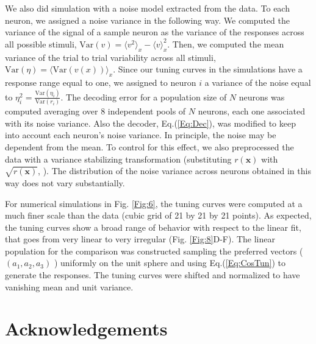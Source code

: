 \documentclass[a4paper]{article}%
\begin{document}
We also did simulation with a noise model extracted from the data. To each
neuron, we assigned a noise variance in the following way. We computed
the variance of the signal of a sample neuron as the variance of the responses across all possible
stimuli, $\text{Var}(v) = \langle v^{2} \rangle_{x} - \langle v\rangle^{2}
_{x}$. Then, we computed the mean variance of the trial to trial variability
across all stimuli, $\text{Var}(\eta) = \langle\text{Var}(v(x))\rangle_{x}$.
Since our tuning curves in the simulations have a response range equal to one, we
assigned to neuron $i$ a variance of the noise equal to $\eta_{i}^{2}
= \frac{\text{Var}(\eta_{i})}{\text{Var}(r_{i})}$. The decoding error for a
population size of $N$ neurons was computed averaging over 8 independent pools
of $N$ neurons, each one associated with its noise variance. Also the decoder,
Eq.(\ref{Eq:Dec}), was modified to keep into account each neuron's noise
variance. In principle, the noise may be dependent from the mean. To control
for this effect, we also preprocessed the data with a variance stabilizing
transformation (substituting $r(\mathbf{x}) $ with $\sqrt{r(\mathbf{x})}$,
\cite{SRJ1999TheStatistics}). The distribution of the noise variance across
neurons obtained in this way does not vary substantially. 

For numerical simulations in Fig. \ref{Fig:6}, the tuning curves were computed
at a much finer scale than the data (cubic grid of 21 by 21 by 21 points). As
expected, the tuning curves show a broad range of behavior with respect to the
linear fit, that goes from very linear to very irregular (Fig. \ref{Fig:8}D-F).
The linear population for the comparison was constructed sampling the
preferred vectors ($(a_{1},a_{2},a_{3})$ ) uniformly on the unit sphere and
using Eq.(\ref{Eq:CosTun}) to generate the responses. The tuning curves were shifted and normalized to have vanishing mean and unit variance.



\section{Acknowledgements}
\end{document}
